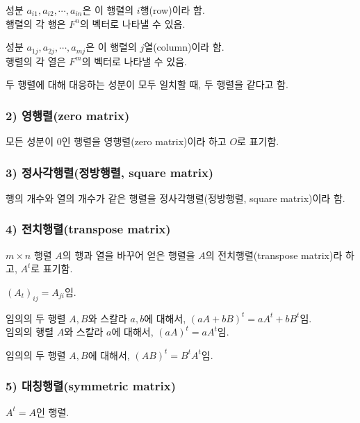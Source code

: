 성분 $a_{i1}, a_{i2}, \cdots ,a_{in}$은 이 행렬의 $i$행(row)이라 함.\\
행렬의 각 행은 $F^n$의 벡터로 나타낼 수 있음.

성분 $a_{1j}, a_{2j}, \cdots ,a_{mj}$은 이 행렬의 $j$열(column)이라 함.\\
행렬의 각 열은 $F^m$의 벡터로 나타낼 수 있음.

두 행렬에 대해 대응하는 성분이 모두 일치할 때, 두 행렬을 같다고 함.

\subsubsection*{2) 영행렬(zero matrix)\\}
\begin{DEF}
모든 성분이 0인 행렬을 영행렬(zero matrix)이라 하고 $O$로 표기함.
\end{DEF}

\subsubsection*{3) 정사각행렬(정방행렬, square matrix)\\}
\begin{DEF}
행의 개수와 열의 개수가 같은 행렬을 정사각행렬(정방행렬, square matrix)이라 함.
\end{DEF}

\subsubsection*{4) 전치행렬(transpose matrix)\\}
\begin{DEF}
$m \times n$ 행렬 $A$의 행과 열을 바꾸어 얻은 행렬을 $A$의 전치행렬(transpose matrix)라 하고, $A^t$로 표기함.
\end{DEF}

$(A_t)_{ij}=A_{ji}$임.

임의의 두 행렬 $A,B$와 스칼라 $a,b$에 대해서, $(aA+bB)^t=aA^t+bB^t$임.\\
임의의 행렬 $A$와 스칼라 $a$에 대해서, $(aA)^t=aA^t$임.

임의의 두 행렬 $A,B$에 대해서, $(AB)^t=B^{t}A^{t}$임.

\subsubsection*{5) 대칭행렬(symmetric matrix)\\}
\begin{DEF}
$A^t=A$인 행렬.
\end{DEF}

